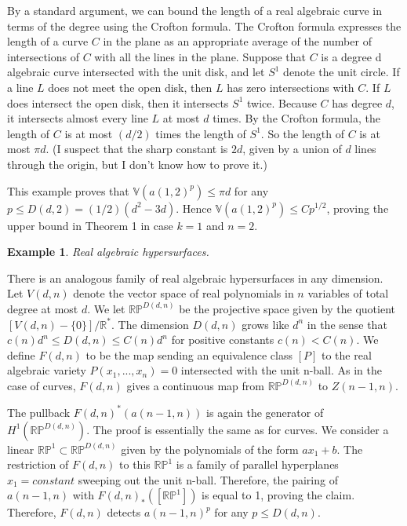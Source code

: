 \documentclass{amsart}
\newtheorem*{Theorem 1}{Theorem 1}
\newtheorem*{Theorem 2}{Theorem 2}
\newtheorem*{Theorem 1A}{Theorem 1A}
\newtheorem*{Theorem 2A}{Theorem 2A}
\newtheorem{example}{Example}
\newtheorem*{vanishing lemma}{Vanishing Lemma}
\numberwithin{equation}{section}
\begin{document}
By a standard argument, we can bound the length of a real
algebraic curve in terms of the degree using the Crofton formula. 
The Crofton formula expresses the length of a curve $C$ in the
plane as an appropriate average of the number of intersections of
$C$ with all the lines in the plane.  Suppose that $C$ is a
degree d algebraic curve intersected with the unit disk, and let
$S^1$ denote the unit circle.  If a line $L$ does not meet the
open disk, then $L$ has zero intersections with $C$. If $L$ does
intersect the open disk, then it intersects $S^1$ twice. Because
$C$ has degree $d$, it intersects almost every line $L$ at most
$d$ times.  By the Crofton formula, the length of $C$ is at most
$(d/2)$ times the length of $S^1$.  So the length of $C$ is at
most $\pi d$.  (I suspect that the sharp constant is $2d$, given
by a union of $d$ lines through the origin, but I don't know how
to prove it.)

This example proves that $\mathbb{V}(a(1,2)^p) \le \pi d$ for any
$p \le D(d,2) = (1/2) (d^2 - 3d)$.  Hence $\mathbb{V}(a(1,2)^p) \le
C p^{1/2}$, proving the upper bound in Theorem 1 in case $k=1$ and
$n=2$.

\begin{example} Real algebraic hypersurfaces.
\end{example}

There is an analogous family of real algebraic hypersurfaces in
any dimension.  Let $V(d,n)$ denote the vector space of real
polynomials in $n$ variables of total degree at most $d$.  We let
$\mathbb{RP}^{D(d,n)}$ be the projective space given by the
quotient $[V(d,n) -
\{ 0 \}] / \mathbb{R}^*$.  The dimension $D(d,n)$ grows like $d^n$
in the sense that $c(n) d^n \le D(d,n)
\le C(n) d^n$ for positive constants $c(n) < C(n)$.  We define
$F(d,n)$ to be the map sending an equivalence class $[P]$ to the
real algebraic variety $P(x_1, ..., x_n) = 0$ intersected with
the unit n-ball.  As in the case of curves, $F(d,n)$ gives a
continuous map from $\mathbb{RP}^{D(d,n)}$ to $Z(n-1,n)$.

The pullback $F(d,n)^*(a(n-1,n))$ is again the generator of
$H^1(\mathbb{RP}^{D(d,n)})$.  The proof is essentially the same
as for curves.  We consider a linear $\mathbb{RP}^1 \subset
\mathbb{RP}^{D(d,n)}$ given by the polynomials of the form $a x_1
+ b$.  The restriction of $F(d,n)$ to this $\mathbb{RP}^1$ is a
family of parallel hyperplanes $x_1 = constant$ sweeping out the
unit n-ball.  Therefore, the pairing of $a(n-1,n)$ with
$F(d,n)_*([\mathbb{RP}^1])$ is equal to 1, proving the claim. 
Therefore, $F(d,n)$ detects $a(n-1,n)^p$ for any $p \le D(d,n)$. 
\end{document}
